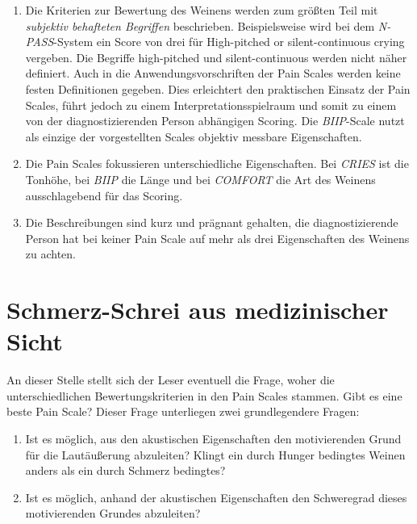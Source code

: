 \begin{enumerate}

\item Die Kriterien zur Bewertung des Weinens werden zum größten Teil mit \emph{subjektiv behafteten Begriffen} beschrieben. Beispielsweise wird bei dem \emph{N-PASS}-System ein Score von drei für \glqq High-pitched or silent-continuous crying\grqq{} vergeben. Die Begriffe \glqq high-pitched\grqq{} und \glqq silent-continuous\grqq{} werden nicht näher definiert.  Auch in die Anwendungsvorschriften der Pain Scales werden keine festen Definitionen gegeben. Dies erleichtert den praktischen Einsatz der Pain Scales, führt jedoch zu einem Interpretationsspielraum und somit zu einem von der diagnostizierenden Person abhängigen Scoring. Die \emph{BIIP}-Scale nutzt als einzige der vorgestellten Scales objektiv messbare Eigenschaften. 

\item Die Pain Scales fokussieren unterschiedliche Eigenschaften. Bei \emph{CRIES} ist die Tonhöhe, bei \emph{BIIP} die Länge und bei \emph{COMFORT} die Art des Weinens ausschlagebend für das Scoring.

\item Die Beschreibungen sind kurz und prägnant gehalten, die diagnostizierende Person hat bei keiner Pain Scale auf mehr als drei Eigenschaften des Weinens zu achten.
\end{enumerate}


\section{Schmerz-Schrei aus medizinischer Sicht}

An dieser Stelle stellt sich der Leser eventuell die Frage, woher die unterschiedlichen Bewertungskriterien in den Pain Scales stammen. Gibt es eine \glqq beste\grqq{} Pain Scale? Dieser Frage unterliegen zwei grundlegendere Fragen:

\begin{enumerate}
	 \item Ist es möglich, aus den akustischen Eigenschaften den motivierenden Grund für die Lautäußerung abzuleiten?  Klingt ein durch Hunger bedingtes Weinen anders als ein durch Schmerz bedingtes?
	 \item Ist es möglich, anhand der akustischen Eigenschaften den Schweregrad dieses motivierenden Grundes abzuleiten?
\end{enumerate}

